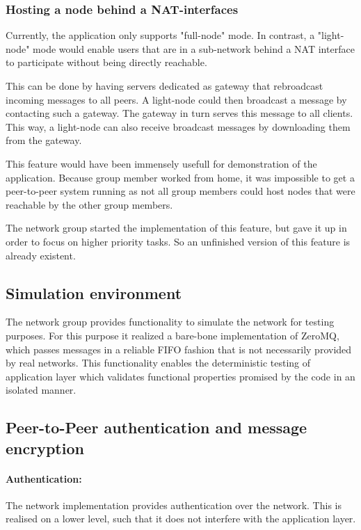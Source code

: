 \subsubsection{Hosting a node behind a NAT-interfaces}

Currently, the application only supports "full-node" mode. In contrast, a "light-node" mode would enable users that are in a sub-network behind a NAT interface to participate without being directly reachable.

This can be done by having servers dedicated as gateway that rebroadcast incoming messages to all peers. A light-node could then broadcast a message by contacting such a gateway. The gateway in turn serves this message to all clients. This way, a light-node can also receive broadcast messages by downloading them from the gateway.

This feature would have been immensely usefull for demonstration of the application. Because group member worked from home, it was impossible to get a peer-to-peer system running as not all group members could host nodes that were reachable by the other group members.

The network group started the implementation of this feature, but gave it up in order to focus on higher priority tasks. So an unfinished version of this feature is already existent.

\subsection{Simulation environment}

The network group provides functionality to simulate the network for testing purposes. For this purpose it realized a bare-bone implementation of ZeroMQ, which passes messages in a reliable FIFO fashion that is not necessarily provided by real networks. This functionality enables the deterministic testing of application layer which validates functional properties promised by the code in an isolated manner.

\subsection{Peer-to-Peer authentication and message encryption}

\paragraph{Authentication:} The network implementation provides authentication over the network. This is realised on a lower level, such that it does not interfere with the application layer.

